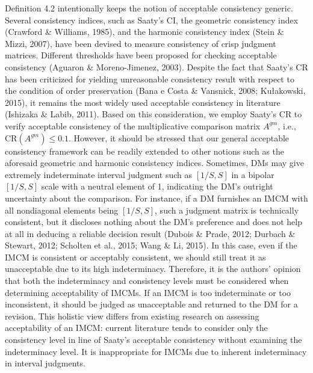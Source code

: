 \documentclass[10pt]{article}
\begin{document}
Definition 4.2 intentionally keeps the notion of acceptable consistency generic. Several consistency indices, such as Saaty's CI, the geometric consistency index (Crawford \& Williams, 1985), and the harmonic consistency index (Stein \& Mizzi, 2007), have been devised to measure consistency of crisp judgment matrices. Different thresholds have been proposed for checking acceptable consistency (Aguaron \& Moreno-Jimenez, 2003). Despite the fact that Saaty's CR has been criticized for yielding unreasonable consistency result with respect to the condition of order preservation (Bana e Costa \& Vansnick, 2008; Kułakowski, 2015), it remains the most widely used acceptable consistency in literature (Ishizaka \& Labib, 2011). Based on this consideration, we employ Saaty's CR to verify acceptable consistency of the multiplicative comparison matrix $A^{g m}$, i.e., $\mathrm{CR}\left(A^{g m}\right) \leq 0.1$. However, it should be stressed that our general acceptable consistency framework can be readily extended to other notions such as the aforesaid geometric and harmonic consistency indices.
Sometimes, DMs may give extremely indeterminate interval judgment such as $[1 / S, S]$ in a bipolar $[1 / S, S]$ scale with a neutral element of 1, indicating the DM's outright uncertainty about the comparison. For instance, if a DM furnishes an IMCM with all nondiagonal elements being $[1 / S, S]$, such a judgment matrix is technically consistent, but it discloses nothing about the DM's preference and does not help at all in deducing a reliable decision result (Dubois \& Prade, 2012; Durbach \& Stewart, 2012; Scholten et al., 2015; Wang \& Li, 2015). In this case, even if the IMCM is consistent or acceptably consistent, we should still treat it as unacceptable due to its high indeterminacy. Therefore, it is the authors' opinion that both the indeterminacy and consistency levels must be considered when determining acceptability of IMCMs. If an IMCM is too indeterminate or too inconsistent, it should be judged as unacceptable and returned to the DM for a revision. This holistic view differs from existing research on assessing acceptability of an IMCM: current literature tends to consider only the consistency level in line of Saaty's acceptable consistency without examining the indeterminacy level. It is inappropriate for IMCMs due to inherent indeterminacy in interval judgments.
\end{document}
